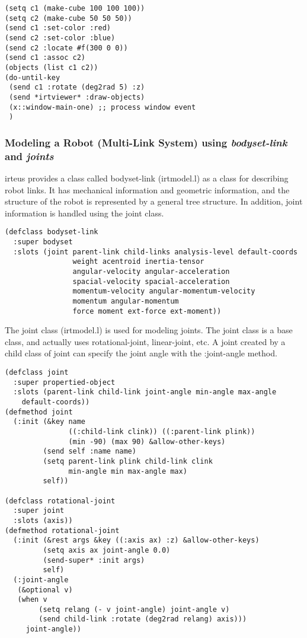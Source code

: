 {\baselineskip=10pt
\begin{verbatim}
(setq c1 (make-cube 100 100 100))
(setq c2 (make-cube 50 50 50))
(send c1 :set-color :red)
(send c2 :set-color :blue)
(send c2 :locate #f(300 0 0))
(send c1 :assoc c2)
(objects (list c1 c2))
(do-until-key
 (send c1 :rotate (deg2rad 5) :z)
 (send *irtviewer* :draw-objects)
 (x::window-main-one) ;; process window event
 )
\end{verbatim}
}

\subsubsection{Modeling a Robot (Multi-Link System) using \textit{bodyset-link} and \textit{joints}}

irteus provides a class called bodyset-link (irtmodel.l) as a class for describing robot links. It has mechanical information and geometric information, and the structure of the robot is represented by a general tree structure. In addition, joint information is handled using the joint class.

{\baselineskip=10pt
\begin{verbatim}
(defclass bodyset-link
  :super bodyset
  :slots (joint parent-link child-links analysis-level default-coords
                weight acentroid inertia-tensor
                angular-velocity angular-acceleration
                spacial-velocity spacial-acceleration
                momentum-velocity angular-momentum-velocity
                momentum angular-momentum
                force moment ext-force ext-moment))
\end{verbatim}
}

The joint class (irtmodel.l) is used for modeling joints. The joint class is a base class, and actually uses rotational-joint, linear-joint, etc.
A joint created by a child class of joint can specify the joint angle with the :joint-angle method.

{\baselineskip=10pt
\begin{verbatim}
(defclass joint
  :super propertied-object
  :slots (parent-link child-link joint-angle min-angle max-angle
	default-coords))
(defmethod joint
  (:init (&key name
               ((:child-link clink)) ((:parent-link plink))
               (min -90) (max 90) &allow-other-keys)
         (send self :name name)
         (setq parent-link plink child-link clink
               min-angle min max-angle max)
         self))

(defclass rotational-joint
  :super joint
  :slots (axis))
(defmethod rotational-joint
  (:init (&rest args &key ((:axis ax) :z) &allow-other-keys)
         (setq axis ax joint-angle 0.0)
         (send-super* :init args)
         self)
  (:joint-angle
   (&optional v)
   (when v
        (setq relang (- v joint-angle) joint-angle v)
        (send child-link :rotate (deg2rad relang) axis)))
     joint-angle))
\end{verbatim}
}

